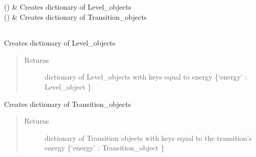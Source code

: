 \documentclass[letterpaper,10pt,english]{sphinxmanual}
\begin{document}
\begin{fulllineitems}
\begin{savenotes}
\begin{longtable}{}
\endlastfoot

{\hyperref[\detokenize{nice_scheme_plotter:database_reader.Database_csv.levelsPackage}]{}}()
&
Creates dictionary of Level\_objects
\\
\hline
{\hyperref[\detokenize{nice_scheme_plotter:database_reader.Database_csv.transitionsPackage}]{}}()
&
Creates dictionary of Transition\_objects
\\
\hline
\end{longtable}\sphinxatlongtableend\end{savenotes}


\begin{savenotes}\sphinxattablestart
\centering
\begin{tabulary}{\linewidth}[t]{|T|T|}
\hline

&\\
\hline
\end{tabulary}
\par
\sphinxattableend\end{savenotes}

\begin{fulllineitems}
\label{\detokenize{nice_scheme_plotter:database_reader.Database_csv.levelsPackage}}
Creates dictionary of Level\_objects
\begin{quote}\begin{description}
\item[{Returns}] \leavevmode
dictionary of Level\_objects with keys equal to energy \{‘energy’ : Level\_object \}

\end{description}\end{quote}

\end{fulllineitems}


\begin{fulllineitems}
\label{\detokenize{nice_scheme_plotter:database_reader.Database_csv.transitionsPackage}}
Creates dictionary of Transition\_objects
\begin{quote}\begin{description}
\item[{Returns}] \leavevmode
dictionary of Transition objects with keys equal to the transition’s energy \{‘energy’ : Transition\_object \}


\end{description}
\end{quote}
\end{fulllineitems}
\end{fulllineitems}
\end{document}
